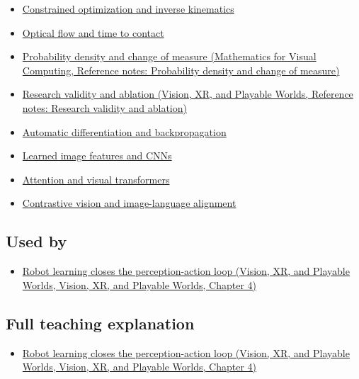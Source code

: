 \begin{itemize}
\tightlist
\item
  \hyperref[appendix-29f4bea4c2bb]{Constrained optimization and inverse kinematics}
\item
  \hyperref[appendix-e2e73f8cd93e]{Optical flow and time to contact}
\item
  \href{../02-Mathematics-for-Visual-Computing/main.pdf\#nameddest=appendix-4815cd87ab8b}{Probability density and change of measure (Mathematics for Visual Computing, Reference notes: Probability density and change of measure)}
\item
  \href{../07-Vision-XR-and-Playable-Worlds/main.pdf\#nameddest=appendix-65788587ef78}{Research validity and ablation (Vision, XR, and Playable Worlds, Reference notes: Research validity and ablation)}
\item
  \hyperref[appendix-40df0855b4a7]{Automatic differentiation and backpropagation}
\item
  \hyperref[appendix-47c51ea026fb]{Learned image features and CNNs}
\item
  \hyperref[appendix-a9d5dfdd164a]{Attention and visual transformers}
\item
  \hyperref[appendix-772f1fd96148]{Contrastive vision and image-language alignment}
\end{itemize}

\subsection{Used by}\label{appendix-b0c42da325f1-used-by}

\begin{itemize}
\tightlist
\item
  \href{../07-Vision-XR-and-Playable-Worlds/main.pdf\#nameddest=04-visual-computing-ii-ch034-robot-learning-closes-the-perception-action-loop}{Robot learning closes the perception-action loop (Vision, XR, and Playable Worlds, Vision, XR, and Playable Worlds, Chapter 4)}
\end{itemize}

\subsection{Full teaching explanation}\label{appendix-b0c42da325f1-full-teaching-explanation}

\begin{itemize}
\tightlist
\item
  \href{../07-Vision-XR-and-Playable-Worlds/main.pdf\#nameddest=04-visual-computing-ii-ch034-robot-learning-closes-the-perception-action-loop}{Robot learning closes the perception-action loop (Vision, XR, and Playable Worlds, Vision, XR, and Playable Worlds, Chapter 4)}
\end{itemize}

